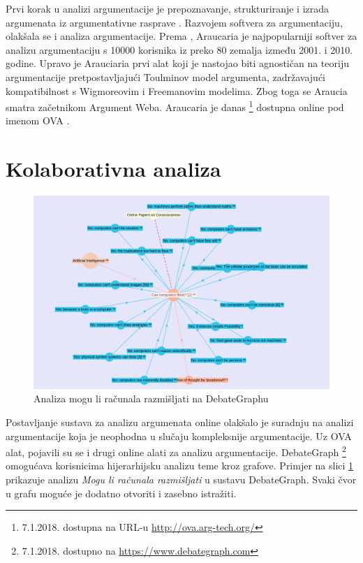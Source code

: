 Prvi korak u analizi argumentacije je prepoznavanje, strukturiranje i 
izrada argumenata iz argumentativne rasprave \citep{scheuer2010computer,
prudencio2005visualizing}. Razvojem softvera za argumentaciju, 
olakšala se i analiza argumentacije. Prema \cite{Chris2017-REETAW}, Araucaria
je najpopularniji softver za analizu argumentaciju s 10000 korisnika iz
preko 80 zemalja između 2001. i 2010. godine. Upravo je Arauciaria
prvi alat koji je nastojao biti agnostičan na teoriju argumentacije
pretpostavljajući Toulminov model argumenta, zadržavajući kompatibilnost
s Wigmoreovim \citep{wigmore2016wigmore} i 
Freemanovim \citep{freeman1991dialectics} modelima. 
Zbog toga se Araucia smatra začetnikom Argument Weba. Araucaria je 
danas \footnote{7.1.2018. dostupna na URL-u \url{http://ova.arg-tech.org/}} 
dostupna online pod imenom OVA . 

\section{Kolaborativna analiza}

\begin{figure}
\centering
\includegraphics[scale=0.4]{debategraph.png}
\caption{Analiza mogu li računala razmišljati na DebateGraphu}
\label{fig:computers}
\end{figure}

Postavljanje sustava za analizu argumenata online olakšalo je suradnju 
na analizi argumentacije koja je neophodna u slučaju kompleksnije
argumentacije. Uz OVA alat, pojavili su se i drugi online alati za
analizu argumentacije. DebateGraph \footnote{7.1.2018. dostupno na 
\url{https://www.debategraph.com}} omogućava korisnicima hijerarhijsku 
analizu teme kroz grafove. Primjer na slici \ref{fig:computers} prikazuje
analizu \emph{Mogu li računala razmišljati} u sustavu DebateGraph. Svaki
čvor u grafu moguće je dodatno otvoriti i zasebno istražiti. 

